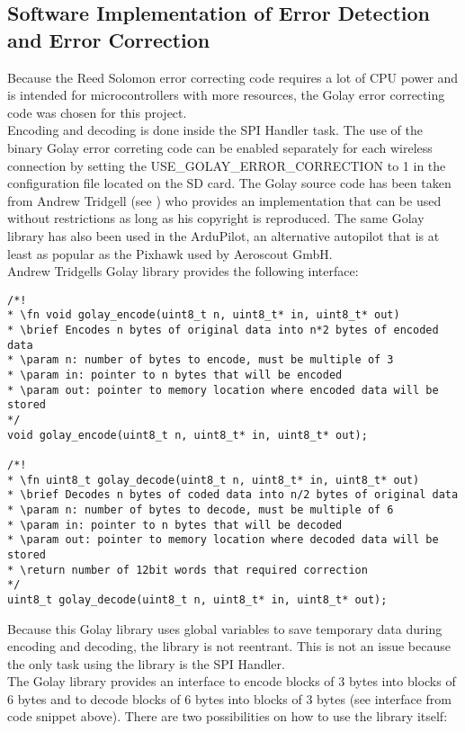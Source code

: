\subsection{Software Implementation of Error Detection and Error Correction}
Because the Reed Solomon error correcting code requires a lot of CPU power and is intended for microcontrollers with more resources, the Golay error correcting code was chosen for this project.\\
Encoding and decoding is done inside the SPI Handler task. The use of the binary Golay error correting code can be enabled separately for each wireless connection by setting the USE\_GOLAY\_ERROR\_CORRECTION to 1 in the configuration file located on the SD card. The Golay source code has been taken from Andrew Tridgell (see \cite{GolaySourceCode}) who provides an implementation that can be used without restrictions as long as his copyright is reproduced. The same Golay library has also been used in the ArduPilot, an alternative autopilot that is at least as popular as the Pixhawk used by Aeroscout GmbH.\\
Andrew Tridgells Golay library provides the following interface:
\begin{lstlisting}
/*!
* \fn void golay_encode(uint8_t n, uint8_t* in, uint8_t* out)
* \brief Encodes n bytes of original data into n*2 bytes of encoded data
* \param n: number of bytes to encode, must be multiple of 3
* \param in: pointer to n bytes that will be encoded
* \param out: pointer to memory location where encoded data will be stored
*/
void golay_encode(uint8_t n, uint8_t* in, uint8_t* out);

/*!
* \fn uint8_t golay_decode(uint8_t n, uint8_t* in, uint8_t* out)
* \brief Decodes n bytes of coded data into n/2 bytes of original data
* \param n: number of bytes to decode, must be multiple of 6
* \param in: pointer to n bytes that will be decoded
* \param out: pointer to memory location where decoded data will be stored
* \return number of 12bit words that required correction
*/
uint8_t golay_decode(uint8_t n, uint8_t* in, uint8_t* out);
\end{lstlisting}
Because this Golay library uses global variables to save temporary data during encoding and decoding, the library is not reentrant. This is not an issue because the only task using the library is the SPI Handler.\\
The Golay library provides an interface to encode blocks of 3 bytes into blocks of 6 bytes and to decode blocks of 6 bytes into blocks of 3 bytes (see interface from code snippet above). There are two possibilities on how to use the library itself:
